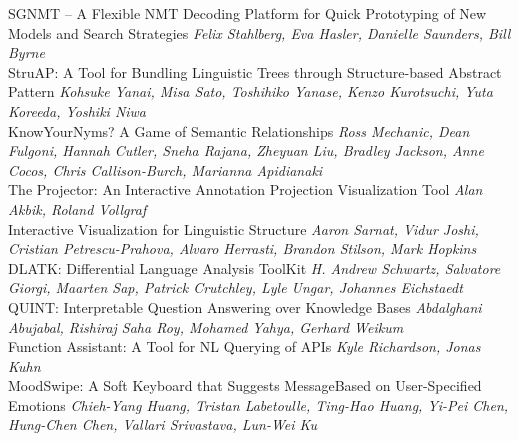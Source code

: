 \documentclass{book}
\begin{document}
    \noindent	SGNMT -- A Flexible NMT Decoding Platform for Quick Prototyping of New Models and Search Strategies \newline 
    {\itshape Felix Stahlberg, Eva Hasler, Danielle Saunders, Bill Byrne} \\
    
    \noindent	StruAP: A Tool for Bundling Linguistic Trees through Structure-based Abstract Pattern \newline 
    {\itshape Kohsuke Yanai, Misa Sato, Toshihiko Yanase, Kenzo Kurotsuchi, Yuta Koreeda, Yoshiki Niwa} \\
    
    \noindent	KnowYourNyms? A Game of Semantic Relationships \newline 
    {\itshape Ross Mechanic, Dean Fulgoni, Hannah Cutler, Sneha Rajana, Zheyuan Liu, Bradley Jackson, Anne Cocos, Chris Callison-Burch, Marianna Apidianaki} \\
    
    \noindent	The Projector: An Interactive Annotation Projection Visualization Tool \newline 
    {\itshape Alan Akbik, Roland Vollgraf} \\
    
    \noindent	Interactive Visualization for Linguistic Structure \newline 
    {\itshape Aaron Sarnat, Vidur Joshi, Cristian Petrescu-Prahova, Alvaro Herrasti, Brandon Stilson, Mark Hopkins} \\
    
    \noindent	DLATK: Differential Language Analysis ToolKit \newline 
    {\itshape H. Andrew Schwartz, Salvatore Giorgi, Maarten Sap, Patrick Crutchley, Lyle Ungar, Johannes Eichstaedt} \\
    
    \noindent	QUINT: Interpretable Question Answering over Knowledge Bases \newline 
    {\itshape Abdalghani Abujabal, Rishiraj Saha Roy, Mohamed Yahya, Gerhard Weikum} \\
    
    \noindent	Function Assistant: A Tool for NL Querying of APIs \newline 
    {\itshape Kyle Richardson, Jonas Kuhn} \\
    
    \noindent	MoodSwipe: A Soft Keyboard that Suggests MessageBased on User-Specified Emotions \newline 
    {\itshape Chieh-Yang Huang, Tristan Labetoulle, Ting-Hao Huang, Yi-Pei Chen, Hung-Chen Chen, Vallari Srivastava, Lun-Wei Ku} \\
    
\end{document}
